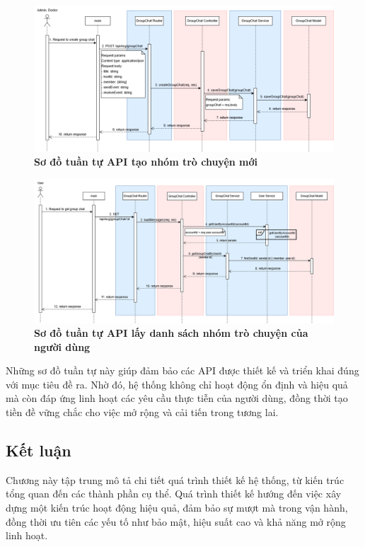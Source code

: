 \begin{figure}[H]
	\centering
	\includegraphics[width=16cm]{Images/api_sequence/chat/createGroupChat.drawio.png}
	\caption[Sơ đồ tuần tự API tạo nhóm trò chuyện mới]{\bfseries \fontsize{12pt}{0pt}\selectfont Sơ đồ tuần tự API tạo nhóm trò chuyện mới}
	\label{sequence_diagram_create_group_chat}
\end{figure}

\begin{figure}[H]
	\centering
	\includegraphics[width=16cm]{Images/api_sequence/chat/getGroupChat.drawio.png}
	\caption[Sơ đồ tuần tự API lấy danh sách nhóm trò chuyện của người dùng]{\bfseries \fontsize{12pt}{0pt}\selectfont Sơ đồ tuần tự API lấy danh sách nhóm trò chuyện của người dùng}
	\label{sequence_diagram_get_group_chat}
\end{figure}

Những sơ đồ tuần tự này giúp đảm bảo các API được thiết kế và triển khai đúng với mục tiêu đề ra.
Nhờ đó, hệ thống không chỉ hoạt động ổn định và hiệu quả mà còn đáp ứng linh hoạt các yêu cầu thực tiễn của người dùng,
đồng thời tạo tiền đề vững chắc cho việc mở rộng và cải tiến trong tương lai.

\subsection{Kết luận}

Chương này tập trung mô tả chi tiết quá trình thiết kế hệ thống, từ kiến trúc tổng quan đến các thành phần cụ thể.
Quá trình thiết kế hướng đến việc xây dựng một kiến trúc hoạt động hiệu quả, đảm bảo sự mượt mà trong vận hành,
đồng thời ưu tiên các yếu tố như bảo mật, hiệu suất cao và khả năng mở rộng linh hoạt.
\newpage